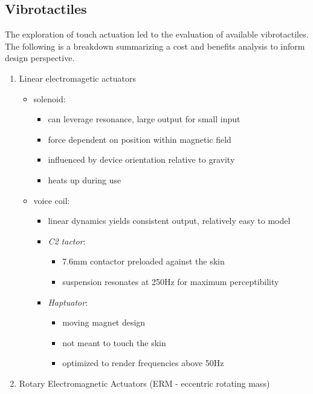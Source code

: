 \subsection{Vibrotactiles}
The exploration of touch actuation led to the evaluation of available vibrotactiles. The following is a breakdown summarizing a cost and benefits analysis to inform design perspective.
\begin{enumerate}
    \item Linear electromagetic actuators
    \begin{itemize}
        \item solenoid:
        \begin{itemize}
            \item can leverage resonance, large output for small input
            \item force dependent on position within magnetic field
            \item influenced by device orientation relative to gravity
            \item heats up during use
        \end{itemize}
        \item voice coil:
        \begin{itemize}
            \item linear dynamics yields consistent output, relatively easy to model
            \item \textit{C2 tactor}:
            \begin{itemize}
                \item 7.6mm contactor preloaded against the skin
                \item suspension resonates at 250Hz for maximum perceptibility
            \end{itemize}
            \item \textit{Haptuator}:
            \begin{itemize}
                \item moving magnet design
                \item not meant to touch the skin
                \item optimized to render frequencies above 50Hz
            \end{itemize}
        \end{itemize}
    \end{itemize}
    \item Rotary Electromagnetic Actuators (ERM - eccentric rotating mass)
    \begin{itemize}

\end{itemize}
\end{enumerate}
